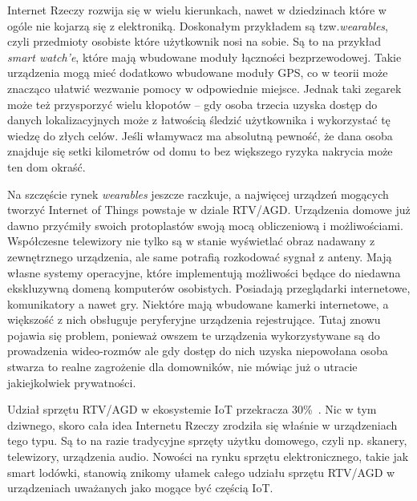 \documentclass[brudnopis]{xmgr}
\begin{document}
Internet Rzeczy rozwija się w wielu kierunkach, nawet w dziedzinach które w ogóle nie kojarzą się z elektroniką. Doskonałym przykładem są tzw.\emph{wearables}, czyli przedmioty osobiste które użytkownik nosi na sobie. Są to na przykład \emph{smart watch'e}, które mają wbudowane moduły łączności bezprzewodowej.  Takie urządzenia mogą mieć dodatkowo wbudowane moduły GPS, co w teorii może znacząco ułatwić wezwanie pomocy w odpowiednie miejsce. Jednak taki zegarek może też przysporzyć wielu kłopotów – gdy osoba trzecia uzyska dostęp do danych lokalizacyjnych  może z łatwością śledzić użytkownika i wykorzystać tę wiedzę do złych celów. Jeśli włamywacz ma absolutną pewność, że dana osoba znajduje się setki kilometrów od domu to bez większego ryzyka nakrycia może ten dom okraść.

Na szczęście rynek \emph{wearables} jeszcze raczkuje, a najwięcej urządzeń mogących tworzyć Internet of Things powstaje w dziale RTV/AGD. Urządzenia domowe już dawno przyćmiły swoich protoplastów swoją mocą obliczeniową i możliwościami. Współczesne telewizory nie tylko są w stanie wyświetlać obraz nadawany z zewnętrznego urządzenia, ale same potrafią rozkodować sygnał z anteny. Mają własne systemy operacyjne, które implementują możliwości będące do niedawna ekskluzywną domeną komputerów osobistych. Posiadają przeglądarki internetowe, komunikatory a nawet gry. Niektóre mają wbudowane kamerki internetowe, a większość z nich obsługuje peryferyjne urządzenia rejestrujące. Tutaj znowu pojawia się problem, ponieważ owszem te urządzenia wykorzystywane są do prowadzenia wideo-rozmów ale gdy dostęp do nich uzyska niepowołana osoba stwarza to realne zagrożenie dla domowników, nie mówiąc już o utracie jakiejkolwiek prywatności.

Udział sprzętu RTV/AGD w ekosystemie IoT przekracza 30\%~\cite{IotWPolsce:2015:CMC}. Nic w tym dziwnego, skoro cała idea Internetu Rzeczy zrodziła się właśnie w urządzeniach tego typu. Są to na razie tradycyjne sprzęty użytku domowego, czyli np. skanery, telewizory, urządzenia audio. Nowości na rynku sprzętu elektronicznego, takie jak smart lodówki, stanowią znikomy ułamek całego udziału sprzętu RTV/AGD w urządzeniach uważanych jako mogące być częścią IoT.

\end{document}

